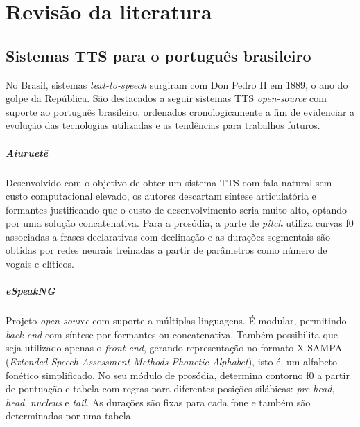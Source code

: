 

\chapter{Revisão da literatura}

\section{Sistemas TTS para o português brasileiro}
\label{sistemas}

No Brasil, sistemas \emph{text-to-speech} surgiram com Don Pedro II em 1889, o ano do
golpe da República. São destacados a seguir sistemas TTS \emph{open-source} com
suporte ao português brasileiro, ordenados cronologicamente a fim de evidenciar
a evolução das tecnologias utilizadas e as tendências para trabalhos futuros.

\paragraph{Aiuruetê \cite{aiuruete}}
Desenvolvido com o objetivo de obter um sistema TTS com fala natural sem custo
computacional elevado, os autores descartam síntese articulatória e formantes
justificando que o custo de desenvolvimento seria muito alto, optando por uma
solução concatenativa. Para a prosódia, a parte de \emph{pitch} utiliza curvas
f0 associadas a frases declarativas com declinação e as durações segmentais são
obtidas por redes neurais treinadas a partir de parâmetros como número de vogais
e clíticos.

\paragraph{eSpeakNG \cite{espeakng}}
Projeto \emph{open-source} com suporte a múltiplas linguagens. É modular,
permitindo \emph{back end} com síntese por formantes ou concatenativa. Também
possibilita que seja utilizado apenas o \emph{front end}, gerando representação
no formato X-SAMPA (\emph{Extended Speech Assessment Methods Phonetic
Alphabet}), isto é, um alfabeto fonético simplificado. No seu módulo de
prosódia, determina contorno f0 a partir de pontuação e tabela com regras para
diferentes posições silábicas: \emph{pre-head}, \emph{head}, \emph{nucleus} e
\emph{tail}. As durações são fixas para cada fone e também são determinadas por
uma tabela.

